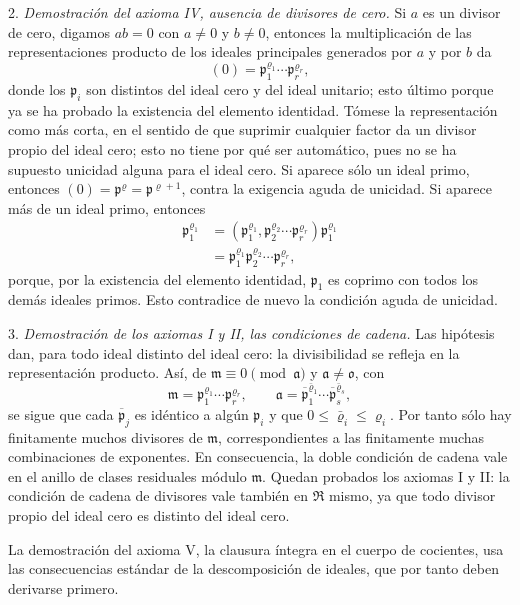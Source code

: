 \documentclass[11pt]{article}
\providecommand{\mR}{\mathfrak{R}}
\providecommand{\mbar}[1]{\overline{#1}}
\providecommand{\ma}{\mathfrak{a}}
\providecommand{\mm}{\mathfrak{m}}
\providecommand{\mo}{\mathfrak{o}}
\providecommand{\mpideal}{\mathfrak{p}}
\begin{document}
2. \emph{Demostración del axioma IV, ausencia de divisores de cero.} Si $a$ es un divisor de cero, digamos $ab=0$ con $a\ne0$ y $b\ne0$, entonces la multiplicación de las representaciones producto de los ideales principales generados por $a$ y por $b$ da
\[
        (0)=\mpideal_1^{\varrho_1}\cdots\mpideal_r^{\varrho_r},
\]
donde los $\mpideal_i$ son distintos del ideal cero y del ideal unitario; esto último porque ya se ha probado la existencia del elemento identidad. Tómese la representación como más corta, en el sentido de que suprimir cualquier factor da un divisor propio del ideal cero; esto no tiene por qué ser automático, pues no se ha supuesto unicidad alguna para el ideal cero. Si aparece sólo un ideal primo, entonces $(0)=\mpideal^\varrho=\mpideal^{\varrho+1}$, contra la exigencia aguda de unicidad. Si aparece más de un ideal primo, entonces
\[
\begin{aligned}
\mpideal_1^{\varrho_1}
 &= (\mpideal_1^{\varrho_1},\mpideal_2^{\varrho_2}\cdots\mpideal_r^{\varrho_r})\mpideal_1^{\varrho_1}  \\
 &= \mpideal_1^{\varrho_1}\mpideal_2^{\varrho_2}\cdots\mpideal_r^{\varrho_r},
\end{aligned}
\]
porque, por la existencia del elemento identidad, $\mpideal_1$ es coprimo con todos los demás ideales primos. Esto contradice de nuevo la condición aguda de unicidad.

3. \emph{Demostración de los axiomas I y II, las condiciones de cadena.} Las hipótesis dan, para todo ideal distinto del ideal cero: la divisibilidad se refleja en la representación producto. Así, de $\mm\equiv0\pmod{\ma}$ y $\ma\ne\mo$, con
\[
        \mm=\mpideal_1^{\varrho_1}\cdots\mpideal_r^{\varrho_r},
        \qquad
        \ma=\mbar\mpideal_1^{\bar\varrho_1}\cdots\mbar\mpideal_s^{\bar\varrho_s},
\]
se sigue que cada $\mbar\mpideal_j$ es idéntico a algún $\mpideal_i$ y que $0\le\bar\varrho_i\le\varrho_i$. Por tanto sólo hay finitamente muchos divisores de $\mm$, correspondientes a las finitamente muchas combinaciones de exponentes. En consecuencia, la doble condición de cadena vale en el anillo de clases residuales módulo $\mm$. Quedan probados los axiomas I y II: la condición de cadena de divisores vale también en $\mR$ mismo, ya que todo divisor propio del ideal cero es distinto del ideal cero.

La demostración del axioma V, la clausura íntegra en el cuerpo de cocientes, usa las consecuencias estándar de la descomposición de ideales, que por tanto deben derivarse primero.
\end{document}
